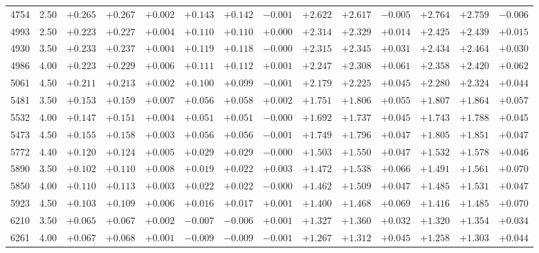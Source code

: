 \documentclass[]{aa}
\begin{document}
\begin{appendix}
\begin{table*}
\begin{center}
\begin{tabular}{llllllllllllll}
4754  &2.50 & $+0.265$ & $+0.267$ & $+0.002$ & $+0.143$ & $+0.142$ & $-0.001$ & $+2.622$ & $+2.617$ & $-0.005$ & $+2.764$ & $+2.759$ & $-0.006$ \\
4993  &2.50 & $+0.223$ & $+0.227$ & $+0.004$ & $+0.110$ & $+0.110$ & $+0.000$ & $+2.314$ & $+2.329$ & $+0.014$ & $+2.425$ & $+2.439$ & $+0.015$ \\
4930  &3.50 & $+0.233$ & $+0.237$ & $+0.004$ & $+0.119$ & $+0.118$ & $-0.000$ & $+2.315$ & $+2.345$ & $+0.031$ & $+2.434$ & $+2.464$ & $+0.030$ \\
4986  &4.00 & $+0.223$ & $+0.229$ & $+0.006$ & $+0.111$ & $+0.112$ & $+0.001$ & $+2.247$ & $+2.308$ & $+0.061$ & $+2.358$ & $+2.420$ & $+0.062$ \\
5061  &4.50 & $+0.211$ & $+0.213$ & $+0.002$ & $+0.100$ & $+0.099$ & $-0.001$ & $+2.179$ & $+2.225$ & $+0.045$ & $+2.280$ & $+2.324$ & $+0.044$ \\
5481  &3.50 & $+0.153$ & $+0.159$ & $+0.007$ & $+0.056$ & $+0.058$ & $+0.002$ & $+1.751$ & $+1.806$ & $+0.055$ & $+1.807$ & $+1.864$ & $+0.057$ \\
5532  &4.00 & $+0.147$ & $+0.151$ & $+0.004$ & $+0.051$ & $+0.051$ & $-0.000$ & $+1.692$ & $+1.737$ & $+0.045$ & $+1.743$ & $+1.788$ & $+0.045$ \\
5473  &4.50 & $+0.155$ & $+0.158$ & $+0.003$ & $+0.056$ & $+0.056$ & $-0.001$ & $+1.749$ & $+1.796$ & $+0.047$ & $+1.805$ & $+1.851$ & $+0.047$ \\
5772  &4.40 & $+0.120$ & $+0.124$ & $+0.005$ & $+0.029$ & $+0.029$ & $-0.000$ & $+1.503$ & $+1.550$ & $+0.047$ & $+1.532$ & $+1.578$ & $+0.046$ \\
5890  &3.50 & $+0.102$ & $+0.110$ & $+0.008$ & $+0.019$ & $+0.022$ & $+0.003$ & $+1.472$ & $+1.538$ & $+0.066$ & $+1.491$ & $+1.561$ & $+0.070$ \\
5850  &4.00 & $+0.110$ & $+0.113$ & $+0.003$ & $+0.022$ & $+0.022$ & $-0.000$ & $+1.462$ & $+1.509$ & $+0.047$ & $+1.485$ & $+1.531$ & $+0.047$ \\
5923  &4.50 & $+0.103$ & $+0.109$ & $+0.006$ & $+0.016$ & $+0.017$ & $+0.001$ & $+1.400$ & $+1.468$ & $+0.069$ & $+1.416$ & $+1.485$ & $+0.070$ \\
6210  &3.50 & $+0.065$ & $+0.067$ & $+0.002$ & $-0.007$ & $-0.006$ & $+0.001$ & $+1.327$ & $+1.360$ & $+0.032$ & $+1.320$ & $+1.354$ & $+0.034$ \\
6261  &4.00 & $+0.067$ & $+0.068$ & $+0.001$ & $-0.009$ & $-0.009$ & $-0.001$ & $+1.267$ & $+1.312$ & $+0.045$ & $+1.258$ & $+1.303$ & $+0.044$ \\

\end{tabular}
\end{center}
\end{table*}
\end{appendix}
\end{document}
